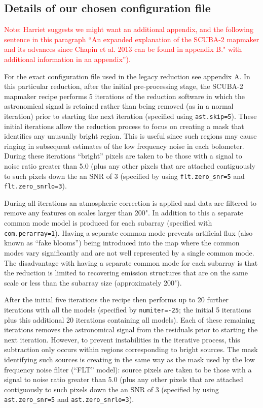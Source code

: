 \documentclass[usenatbib]{mnras}
\newcommand{\note}[1]{\textcolor{red}{Note: #1}}
\begin{document}
\subsection{Details of our chosen configuration file}

\note{Harriet suggests we might want an additional appendix, and the
  following sentence in this paragraph ``An expanded explanation of
  the SCUBA-2 mapmaker and its advances since Chapin et al. 2013 can
  be found in appendix B." with additional information in an
  appendix'').}



For the exact configuration file used in the legacy reduction see
appendix A. In this particular reduction, after the initial
pre-processing stage, the SCUBA-2 mapmaker recipe performs 5
iterations of the reduction software in which the astronomical signal
is retained rather than being removed (as in a normal iteration) prior
to starting the next iteration (specified using \texttt{ast.skip=5}). These
initial iterations allow the reduction process to focus on creating a
mask that identifies any unusually bright region. This is useful since
such regions may cause ringing in subsequent estimates of the low
frequency noise in each bolometer. During these iterations ``bright''
pixels are taken to be those with a signal to noise ratio greater than
5.0 (plus any other pixels that are attached contiguously to such
pixels down the an SNR of 3 (specified by using \texttt{flt.zero\_snr=5} and
\texttt{flt.zero\_snrlo=3}).

During all iterations an atmospheric correction is applied and data
are filtered to remove any features on scales larger than 200". In
addition to this a separate common mode model is produced for each
subarray (specified with \texttt{com.perarray=1}). Having a separate common
mode prevents artificial flux (also known as ``fake blooms'') being
introduced into the map where the common modes vary significantly and
are not well represented by a single common mode. The disadvantage
with having a separate common mode for each subarray is that the
reduction is limited to recovering emission structures that are on the
same scale or less than the subarray size (approximately 200").

After the initial five iterations the recipe then performs up to 20
further iterations with all the models (specified by
\texttt{numiter=-25}; the initial 5 iterations plus this additional 20
iterations containing all models). Each of these remaining iterations
removes the astronomical signal from the residuals prior to starting
the next iteration. However, to prevent instabilities in the iterative
process, this subtraction only occurs within regions corresponding to
bright sources.  The mask identifying such sources is creating in the
same way as the mask used by the low frequency noise filter (``FLT''
model): source pixels are taken to be those with a signal to noise
ratio greater than 5.0 (plus any other pixels that are attached
contiguously to such pixels down the an SNR of 3 (specified by using
\texttt{ast.zero\_snr=5} and \texttt{ast.zero\_snrlo=3}).
\end{document}
